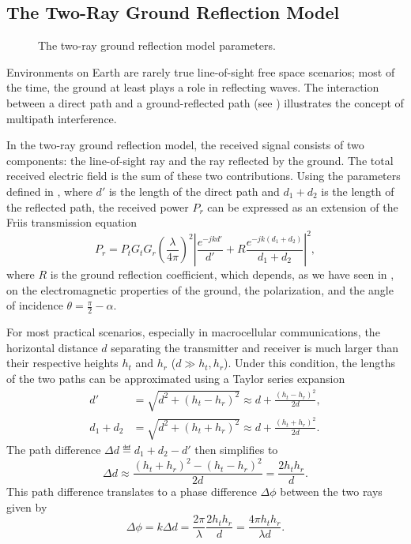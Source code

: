 \subsection{The Two-Ray Ground Reflection Model}

\begin{figure}
  \caption{The two-ray ground reflection model parameters.}
\end{figure}

Environments on Earth are rarely true \gls{line-of-sight} \gls{free space} scenarios; most of the time, the ground at least plays a role in reflecting waves. The interaction between a direct path and a ground-reflected path (see ) illustrates the concept of multipath interference.

In the two-ray ground reflection model, the received signal consists of two components: the \gls{line-of-sight} ray and the ray reflected by the ground. The total received electric field is the sum of these two contributions. Using the parameters defined in , where $d'$ is the length of the direct path and $d_1 + d_2$ is the length of the reflected path, the received power $P_r$ can be expressed as an extension of the Friis transmission equation
\begin{equation}
  P_r = P_t G_t G_r \left( \frac{\lambda}{4\pi} \right)^2 \left| \frac{e^{-jk d'}}{d'} + R \frac{e^{-jk (d_1 + d_2)}}{d_1 + d_2} \right|^2,
\end{equation}
where $R$ is the ground reflection coefficient, which depends, as we have seen in , on the electromagnetic properties of the ground, the polarization, and the angle of incidence $\theta=\tfrac{\pi}{2}-\alpha$.

For most practical scenarios, especially in macrocellular communications, the horizontal distance $d$ separating the transmitter and receiver is much larger than their respective heights $h_t$ and $h_r$ ($d \gg h_t, h_r$). Under this condition, the lengths of the two paths can be approximated using a Taylor series expansion
\begin{align}
  d' &= \sqrt{d^2 + (h_t - h_r)^2} \approx d + \frac{(h_t - h_r)^2}{2d}, \\
  d_1 + d_2 &= \sqrt{d^2 + (h_t + h_r)^2} \approx d + \frac{(h_t + h_r)^2}{2d}.
\end{align}
The path difference $\Delta d \eqdef d_1 + d_2 - d'$ then simplifies to
\begin{equation}
  \Delta d \approx \frac{(h_t + h_r)^2 - (h_t - h_r)^2}{2d} = \frac{2 h_t h_r}{d}.
\end{equation}
This path difference translates to a phase difference $\Delta \phi$ between the two rays given by
\begin{equation}
  \Delta \phi = k \Delta d = \frac{2\pi}{\lambda} \frac{2 h_t h_r}{d} = \frac{4\pi h_t h_r}{\lambda d}.
\end{equation}

